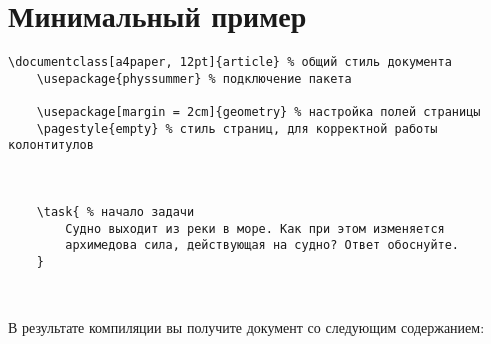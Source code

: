 \section{Минимальный пример}


\begin{lstlisting}[keepspaces, extendedchars = \true, gobble = 3]
    \documentclass[a4paper, 12pt]{article} % общий стиль документа
    \usepackage{physsummer} % подключение пакета

    \usepackage[margin = 2cm]{geometry} % настройка полей страницы
    \pagestyle{empty} % стиль страниц, для корректной работы колонтитулов

    

    \task{ % начало задачи
        Судно выходит из реки в море. Как при этом изменяется
        архимедова сила, действующая на судно? Ответ обоснуйте.
    }

    
\end{lstlisting}

В результате компиляции вы получите документ со следующим содержанием:

\noindent
{}

\vspace{0.5cm}